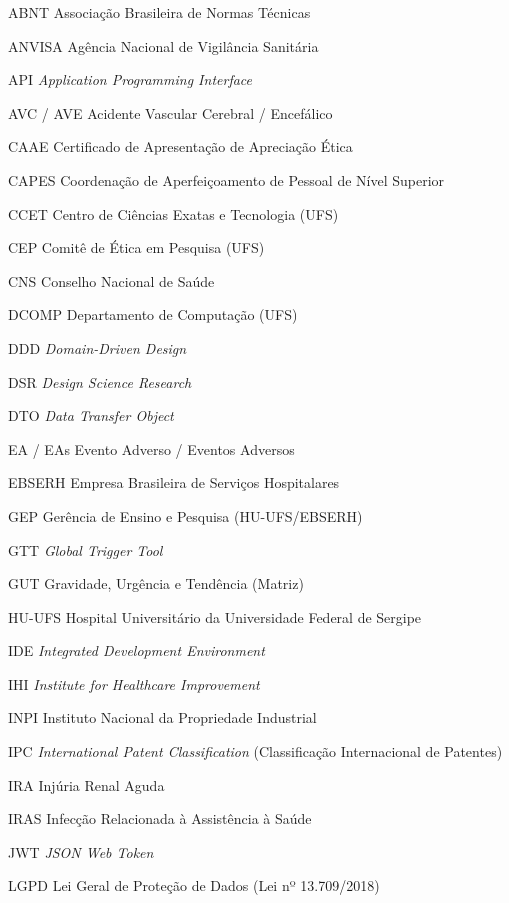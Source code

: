 \begin{siglas}
  \item[ABNT] Associação Brasileira de Normas Técnicas
  \item[ANVISA] Agência Nacional de Vigilância Sanitária
  \item[API] \textit{Application Programming Interface}
  \item[AVC / AVE] Acidente Vascular Cerebral / Encefálico
  \item[CAAE] Certificado de Apresentação de Apreciação Ética
  \item[CAPES] Coordenação de Aperfeiçoamento de Pessoal de Nível Superior
  \item[CCET] Centro de Ciências Exatas e Tecnologia (UFS)
  \item[CEP] Comitê de Ética em Pesquisa (UFS)
  \item[CNS] Conselho Nacional de Saúde
  \item[DCOMP] Departamento de Computação (UFS)
  \item[DDD] \textit{Domain-Driven Design}
  \item[DSR] \textit{Design Science Research}
  \item[DTO] \textit{Data Transfer Object}
  \item[EA / EAs] Evento Adverso / Eventos Adversos
  \item[EBSERH] Empresa Brasileira de Serviços Hospitalares
  \item[GEP] Gerência de Ensino e Pesquisa (HU-UFS/EBSERH)
  \item[GTT] \textit{Global Trigger Tool}
  \item[GUT] Gravidade, Urgência e Tendência (Matriz)
  \item[HU-UFS] Hospital Universitário da Universidade Federal de Sergipe
  \item[IDE] \textit{Integrated Development Environment}
  \item[IHI] \textit{Institute for Healthcare Improvement}
  \item[INPI] Instituto Nacional da Propriedade Industrial
  \item[IPC] \textit{International Patent Classification} (Classificação Internacional de Patentes)
  \item[IRA] Injúria Renal Aguda
  \item[IRAS] Infecção Relacionada à Assistência à Saúde
  \item[JWT] \textit{JSON Web Token}
  \item[LGPD] Lei Geral de Proteção de Dados (Lei nº 13.709/2018)

\end{siglas}
